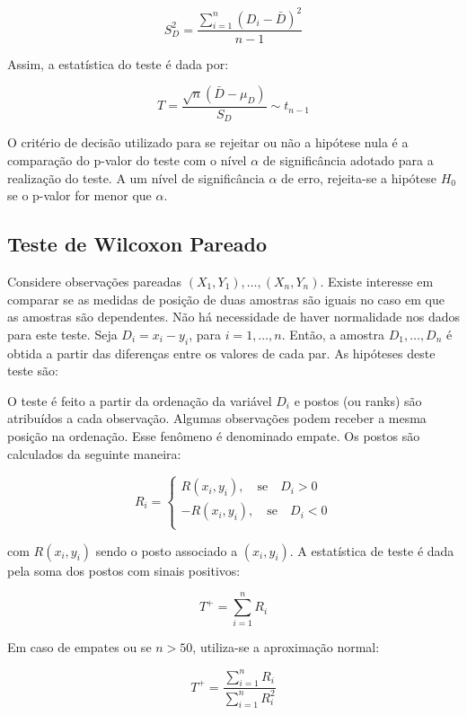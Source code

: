 \documentclass[
  portuguese,
]{estat/estat}
\begin{document}
\[S_D^2 = \frac{\displaystyle \sum_{i=1}^{n}(D_i - \bar{D})^2}{n - 1}\]

Assim, a estatística do teste é dada por:

\[T = \frac{\sqrt{n} \left(\bar{D} - \mu_D\right)}{S_D} \sim t_{n - 1}\]

O critério de decisão utilizado para se rejeitar ou não a hipótese nula
é a comparação do p-valor do teste com o nível \(\alpha\) de
significância adotado para a realização do teste. A um nível de
significância \(\alpha\) de erro, rejeita-se a hipótese \(H_{0}\) se o
p-valor for menor que \(\alpha\).

\subsection{Teste de Wilcoxon Pareado}\label{teste-de-wilcoxon-pareado}

Considere observações pareadas \({(X_1, Y_1), \ldots, (X_n, Y_n)}\).
Existe interesse em comparar se as medidas de posição de duas amostras
são iguais no caso em que as amostras são dependentes. Não há
necessidade de haver normalidade nos dados para este teste. Seja
\(D_i = x_i - y_i\), para \(i = 1, \ldots, n\). Então, a amostra
\(D_1, \ldots, D_n\) é obtida a partir das diferenças entre os valores
de cada par. As hipóteses deste teste são:


O teste é feito a partir da ordenação da variável \(D_i\) e postos (ou
ranks) são atribuídos a cada observação. Algumas observações podem
receber a mesma posição na ordenação. Esse fenômeno é denominado empate.
Os postos são calculados da seguinte maneira:

\[R_i =
\begin{cases}
 R(x_i, y_i), \quad \text{se} \quad D_i > 0\\ 
 -R(x_i, y_i), \quad \text{se} \quad D_i < 0\\
\end{cases}\]

com \(R(x_i, y_i)\) sendo o posto associado a \((x_i, y_i)\). A
estatística de teste é dada pela soma dos postos com sinais positivos:

\[T^+ = \displaystyle \sum_{i=1}^{n} R_i\]

Em caso de empates ou se \(n > 50\), utiliza-se a aproximação normal:

\[T^+ = \frac{\displaystyle \sum_{i=1}^{n} R_i}{\displaystyle \sum_{i=1}^{n} R^2_i}\]
\end{document}
